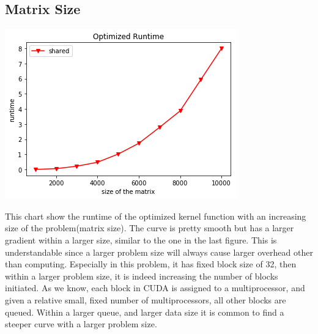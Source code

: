 \documentclass{cs4444}
\begin{document}
\subsection{Matrix Size}
\begin{center}
	\includegraphics{optimized}
\end{center}
This chart show the runtime of the optimized kernel function with an increasing size of the problem(matrix size). The curve is pretty smooth but has a larger gradient within a larger size, similar to the one in the last figure. This is understandable since a larger problem size will always cause larger overhead other than computing. Especially in this problem, it has fixed block size of 32, then within a larger problem size, it is indeed increasing the number of blocks initiated. As we know, each block in CUDA is assigned to a multiprocessor, and given a relative small, fixed number of multiprocessors, all other blocks are queued. Within a larger queue, and larger data size it is common to find a steeper curve with a larger problem size.
\end{document}
